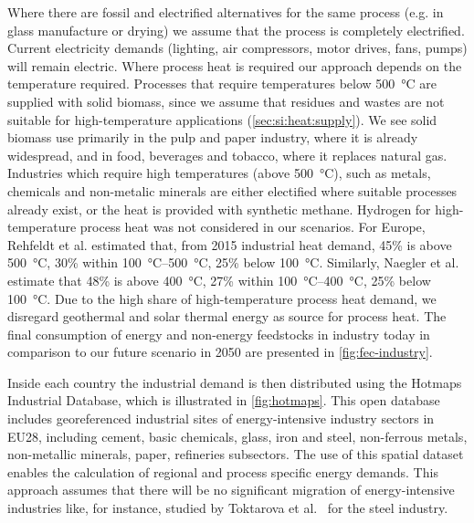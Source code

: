 Where there are fossil and electrified alternatives for the same process (e.g.
in glass manufacture or drying) we assume that the process is completely
electrified. Current electricity demands (lighting, air compressors, motor
drives, fans, pumps) will remain electric. Where process heat is required our
approach depends on the temperature required.
Processes that require temperatures below \SI{500}{\celsius} are supplied with
solid biomass, since we assume that residues and wastes are not suitable for
high-temperature applications (\cref{sec:si:heat:supply}). We see solid biomass
use primarily in the pulp and paper industry, where it is already widespread,
and in food, beverages and tobacco, where it replaces natural gas. Industries
which require high temperatures (above \SI{500}{\celsius}), such as metals,
chemicals and non-metalic minerals are either electified where suitable
processes already exist, or the heat is provided with synthetic methane.
Hydrogen for high-temperature process heat was not considered in our
scenarios. For Europe, Rehfeldt et al.
 estimated that, from 2015 industrial heat
demand, 45\% is above \SI{500}{\celsius}, 30\% within
\SIrange{100}{500}{\celsius}, 25\% below \SI{100}{\celsius}. Similarly, Naegler
et al.  estimate that 48\% is above
\SI{400}{\celsius}, 27\% within \SIrange{100}{400}{\celsius}, 25\% below
\SI{100}{\celsius}. Due to the high share of high-temperature process heat
demand, we disregard geothermal and solar thermal energy as source for process
heat. The final consumption of energy and non-energy feedstocks in industry
today in comparison to our future scenario in 2050 are presented in
\cref{fig:fec-industry}.

Inside each country the industrial demand is then distributed using the Hotmaps
Industrial Database, which is illustrated in \cref{fig:hotmaps}. This open database includes
georeferenced industrial sites of energy-intensive industry sectors in EU28,
including cement, basic chemicals, glass, iron and steel, non-ferrous metals,
non-metallic minerals, paper, refineries subsectors. The use of this spatial
dataset enables the calculation of regional and process specific energy demands.
This approach assumes that there will be no significant migration of
energy-intensive industries like, for instance, studied by Toktarova et
al.~ for the steel industry.


